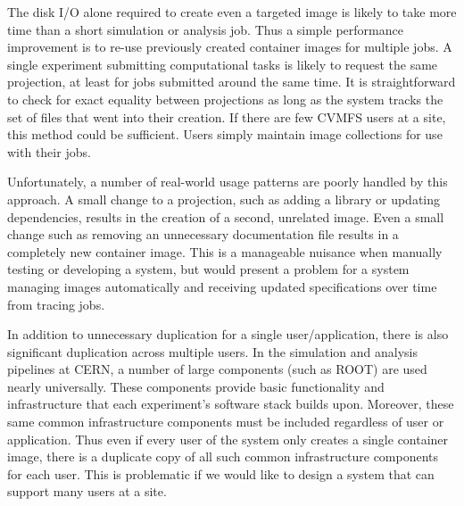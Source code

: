 \documentclass[sigconf]{acmart}
\begin{document}
The disk I/O alone required to create even a targeted image is likely to take more time than a short simulation or analysis job.
Thus a simple performance improvement is to re-use previously created container images for multiple jobs.
A single experiment submitting computational tasks is likely to request the same projection,
at least for jobs submitted around the same time.
It is straightforward to check for exact equality between projections as long as the system tracks the set of files that went into their creation.
If there are few CVMFS users at a site,
this method could be sufficient.
Users simply maintain image collections for use with their jobs.

Unfortunately, a number of real-world usage patterns are poorly handled by this approach.
A small change to a projection,
such as adding a library or updating dependencies,
results in the creation of a second, unrelated image.
Even a small change such as removing an unnecessary documentation file results in a completely new container image.
This is a manageable nuisance when manually testing or developing a system,
but would present a problem for a system managing images automatically and receiving updated specifications over time from tracing jobs.

In addition to unnecessary duplication for a single user/application,
there is also significant duplication across multiple users.
In the simulation and analysis pipelines at CERN,
a number of large components (such as ROOT) are used nearly universally.
These components provide basic functionality and infrastructure that each experiment's software stack builds upon.
Moreover, these same common infrastructure components must be included regardless of user or application.
Thus even if every user of the system only creates a single container image,
there is a duplicate copy of all such common infrastructure components for each user.
This is problematic if we would like to design a system that can support many users at a site.
\end{document}
